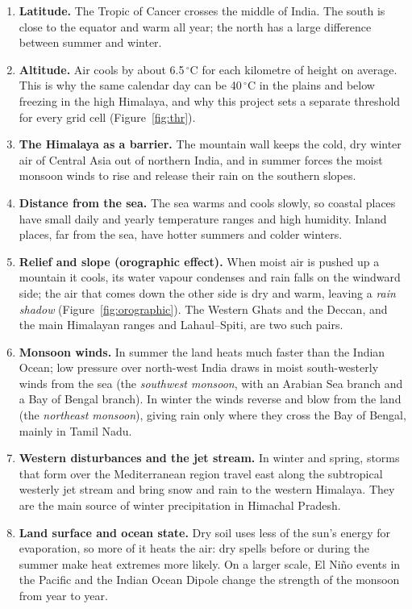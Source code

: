 \documentclass[12pt,a4paper]{report}
\begin{document}
\begin{enumerate}
\item \textbf{Latitude.} The Tropic of Cancer crosses the middle of India. The south is close to the equator and warm
all year; the north has a large difference between summer and winter.
\item \textbf{Altitude.} Air cools by about 6.5\,$^\circ$C for each kilometre of height on average. This is why the
same calendar day can be 40\,$^\circ$C in the plains and below freezing in the high Himalaya, and why this project
sets a separate threshold for every grid cell (Figure~\ref{fig:thr}).
\item \textbf{The Himalaya as a barrier.} The mountain wall keeps the cold, dry winter air of Central Asia out of
northern India, and in summer forces the moist monsoon winds to rise and release their rain on the southern slopes.
\item \textbf{Distance from the sea.} The sea warms and cools slowly, so coastal places have small daily and yearly
temperature ranges and high humidity. Inland places, far from the sea, have hotter summers and colder winters.
\item \textbf{Relief and slope (orographic effect).} When moist air is pushed up a mountain it cools, its water
vapour condenses and rain falls on the windward side; the air that comes down the other side is dry and warm, leaving
a \emph{rain shadow} (Figure~\ref{fig:orographic}). The Western Ghats and the Deccan, and the main Himalayan ranges
and Lahaul--Spiti, are two such pairs.
\item \textbf{Monsoon winds.} In summer the land heats much faster than the Indian Ocean; low pressure over north-west
India draws in moist south-westerly winds from the sea (the \emph{southwest monsoon}, with an Arabian Sea branch and a
Bay of Bengal branch). In winter the winds reverse and blow from the land (the \emph{northeast monsoon}), giving rain
only where they cross the Bay of Bengal, mainly in Tamil Nadu.
\item \textbf{Western disturbances and the jet stream.} In winter and spring, storms that form over the Mediterranean
region travel east along the subtropical westerly jet stream and bring snow and rain to the western Himalaya. They are
the main source of winter precipitation in Himachal Pradesh.
\item \textbf{Land surface and ocean state.} Dry soil uses less of the sun's energy for evaporation, so more of it
heats the air: dry spells before or during the summer make heat extremes more likely. On a larger scale, El Ni\~no
events in the Pacific and the Indian Ocean Dipole change the strength of the monsoon from year to year.
\end{enumerate}
\end{document}
